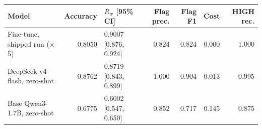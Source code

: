 \begin{tabular}{@{}lrlrrrr@{}}
\toprule
Model & Accuracy & $R_w$ [95\% CI] & Flag prec. & Flag F1 & Cost & HIGH rec. \\
\midrule
Fine-tune, shipped run ($\times$5) & 0.8050 & 0.9007 [0.876, 0.924] & 0.824 & 0.824 & 0.000 & 1.000 \\
DeepSeek v4-flash, zero-shot & 0.8762 & 0.8719 [0.843, 0.899] & 1.000 & 0.904 & 0.013 & 0.995 \\
Base Qwen3-1.7B, zero-shot & 0.6775 & 0.6002 [0.547, 0.650] & 0.852 & 0.717 & 0.145 & 0.875 \\
\bottomrule
\end{tabular}
